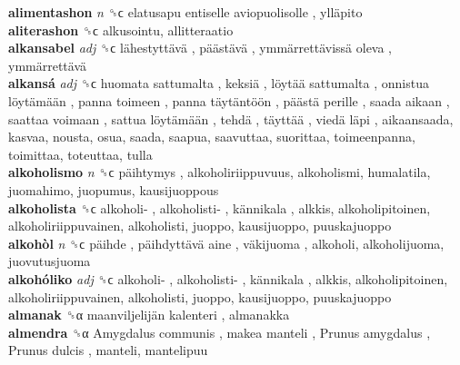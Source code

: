 \textbf{alimentashon} \emph{n}  ␝ϲ   elatusapu entiselle aviopuolisolle ,  ylläpito   \\
\textbf{aliterashon} ␝ϲ  alkusointu, allitteraatio  \\
\textbf{alkansabel} \emph{adj}  ␝ϲ   lähestyttävä ,  päästävä ,  ymmärrettävissä oleva ,  ymmärrettävä   \\
\textbf{alkansá} \emph{adj}  ␝ϲ   huomata sattumalta ,  keksiä ,  löytää sattumalta ,  onnistua löytämään ,  panna toimeen ,  panna täytäntöön ,  päästä perille ,  saada aikaan ,  saattaa voimaan ,  sattua löytämään ,  tehdä ,  täyttää ,  viedä läpi , aikaansaada, kasvaa, nousta, osua, saada, saapua, saavuttaa, suorittaa, toimeenpanna, toimittaa, toteuttaa, tulla  \\
\textbf{alkoholismo} \emph{n}  ␝ϲ   päihtymys , alkoholiriippuvuus, alkoholismi, humalatila, juomahimo, juopumus, kausijuoppous  \\
\textbf{alkoholista} ␝ϲ   alkoholi- ,  alkoholisti- ,  kännikala , alkkis, alkoholipitoinen, alkoholiriippuvainen, alkoholisti, juoppo, kausijuoppo, puuskajuoppo  \\
\textbf{alkohòl} \emph{n}  ␝ϲ   päihde ,  päihdyttävä aine ,  väkijuoma , alkoholi, alkoholijuoma, juovutusjuoma  \\
\textbf{alkohóliko} \emph{adj}  ␝ϲ   alkoholi- ,  alkoholisti- ,  kännikala , alkkis, alkoholipitoinen, alkoholiriippuvainen, alkoholisti, juoppo, kausijuoppo, puuskajuoppo  \\
\textbf{almanak} ␝α   maanviljelijän kalenteri , almanakka  \\
\textbf{almendra} ␝α   Amygdalus communis ,  makea manteli ,  Prunus amygdalus ,  Prunus dulcis , manteli, mantelipuu  \\
